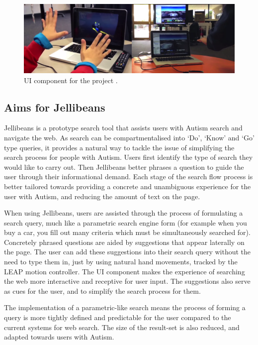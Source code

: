 \documentclass[a4paper, 11pt]{article}
\begin{document}
\begin{figure}[H]
\begin{center}
\includegraphics[scale=0.47]{vision}
\caption{UI component for the project \cite{leap}.}
\label{vision}
\end{center}
\end{figure}

\subsection {Aims for Jellibeans}
Jellibeans is a prototype search tool that assists users with Autism search and navigate the web. As search can be compartmentalised into `Do', `Know' and `Go' type queries, it provides a natural way to tackle the issue of simplifying the search process for people with Autism. Users first identify the type of search they would like to carry out. Then Jellibeans better phrases a question to guide the user through their informational demand. Each stage of the search flow process is better tailored towards providing a concrete and unambiguous experience for the user with Autism, and reducing the amount of text on the page. 

\vspace{5mm}
When using Jellibeans, users are assisted through the process of formulating a search query, much like a parametric search engine form (for example when you buy a car, you fill out many criteria which must be simultaneously searched for). Concretely phrased questions are aided by suggestions that appear laterally on the page. The user can add these suggestions into their search query without the need to type them in, just by using natural hand movements, tracked by the LEAP motion controller. The UI component makes the experience of searching the web more interactive and receptive for user input. The suggestions also serve as cues for the user, and to simplify the search process for them. 

\vspace{5mm}
The implementation of a parametric-like search means the process of forming a query is more tightly defined and predictable for the user compared to the current systems for web search. The size of the result-set is also reduced, and adapted towards users with Autism. 
\end{document}
